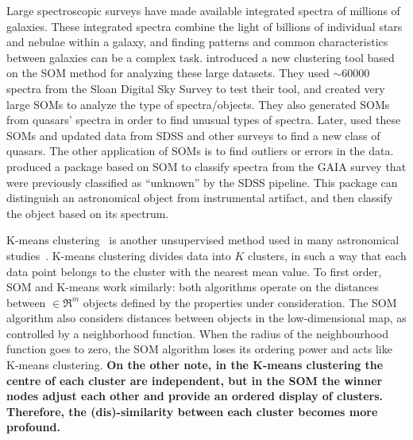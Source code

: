 Large spectroscopic surveys have made available integrated spectra of millions of galaxies.
These integrated spectra combine the light of billions of individual stars and nebulae within a galaxy, and
finding patterns and common characteristics between galaxies can be a complex task.
\citet{In12} introduced a new clustering tool based on the SOM method for analyzing these large datasets.
They used $\sim 60000$ spectra from the Sloan Digital Sky Survey \citep[SDSS;][]{Abazajian09} to test their tool, and created very large SOMs to analyze the type of spectra/objects.
They also generated SOMs from quasars' spectra in order to find unusual types of spectra. 
Later, \citet{Meusinger16} used these SOMs and updated data from SDSS and other surveys to find a new class of quasars.
The other application of SOMs is to find outliers or errors in the data.
\citet{Fustes13} produced a package based on SOM to classify spectra from the GAIA survey that were previously classified as ``unknown'' by the SDSS pipeline. This package can distinguish an astronomical object from instrumental artifact, and then classify the object based on its spectrum.

K-means clustering~\citep{Macqueen67} is another unsupervised method used in many astronomical studies~\citep[e.g.][]{DAbrusco12,Ordov14,Boersma14,Aycha16}.
K-means clustering divides data into $K$ clusters, in such a way that each data point belongs to the cluster with the nearest mean value.
To first order, SOM and K-means work similarly: both algorithms operate on the distances between  $\in \Re^m$ objects defined by the properties under consideration.
The SOM algorithm also considers distances between objects in the low-dimensional map, as  controlled by a neighborhood function. 
When the radius of the neighbourhood function goes to zero, the SOM algorithm loses its ordering power and acts like K-means clustering.
\textbf{On the other note, in the K-means clustering the centre of each cluster are independent, but in the SOM the winner nodes adjust each other and provide an ordered display of clusters. Therefore, the (dis)-similarity between each cluster becomes more profound.}


